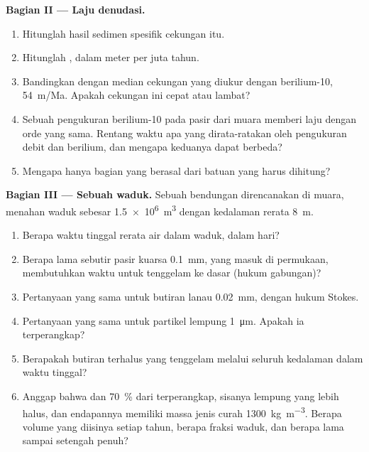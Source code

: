 \begin{problem}
\medskip
\noindent\textbf{Bagian II --- Laju denudasi.}
\begin{enumerate}[resume]
  \item Hitunglah hasil sedimen spesifik cekungan itu.
  \item Hitunglah , dalam meter per juta tahun.
  \item Bandingkan dengan median cekungan yang diukur dengan berilium-10,
        \qty{54}{m/Ma}. Apakah cekungan ini cepat atau lambat?
  \item Sebuah pengukuran berilium-10 pada pasir dari muara memberi laju dengan orde yang sama. Rentang waktu apa yang dirata-ratakan oleh pengukuran debit dan berilium, dan mengapa keduanya dapat berbeda?
  \item Mengapa hanya bagian  yang berasal dari batuan yang harus dihitung?
\end{enumerate}

\medskip
\noindent\textbf{Bagian III --- Sebuah waduk.}
Sebuah bendungan direncanakan di muara, menahan waduk sebesar
\qty{1.5e6}{m^3} dengan kedalaman rerata \qty{8}{m}.
\begin{enumerate}[resume]
  \item Berapa waktu tinggal rerata air dalam waduk, dalam
        hari?
  \item Berapa lama sebutir pasir kuarsa \qty{0.1}{mm}, yang masuk di permukaan, membutuhkan waktu untuk tenggelam ke dasar (hukum gabungan)?
  \item Pertanyaan yang sama untuk butiran lanau \qty{0.02}{mm}, dengan hukum Stokes.
  \item Pertanyaan yang sama untuk partikel lempung \qty{1}{\micro m}. Apakah ia terperangkap?
  \item Berapakah butiran terhalus yang tenggelam melalui seluruh kedalaman dalam waktu tinggal?
  \item Anggap bahwa  dan \qty{70}{\percent} dari  terperangkap, sisanya lempung yang lebih halus, dan endapannya memiliki massa jenis curah \qty{1300}{kg.m^{-3}}. Berapa volume yang diisinya setiap tahun, berapa fraksi waduk, dan berapa lama sampai setengah penuh?
\end{enumerate}


\end{problem}
